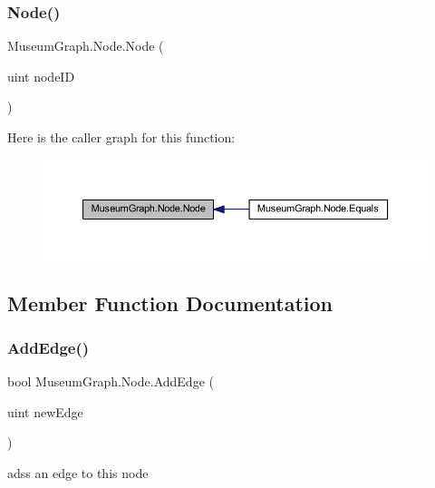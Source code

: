 \subsubsection{\texorpdfstring{Node()}{Node()}}
{\footnotesize\ttfamily Museum\+Graph.\+Node.\+Node (\begin{DoxyParamCaption}\item[{uint}]{node\+ID }\end{DoxyParamCaption})}

Here is the caller graph for this function\+:\nopagebreak
\begin{figure}[H]
\begin{center}
\leavevmode
\includegraphics[width=350pt]{class_museum_graph_1_1_node_a917a203c77b5aa5e65c7293ba896d2c1_icgraph}
\end{center}
\end{figure}


\subsection{Member Function Documentation}
\mbox{\label{class_museum_graph_1_1_node_adecbc3b471d15c5480d4c13e9502ac27}} 
\subsubsection{\texorpdfstring{Add\+Edge()}{AddEdge()}}
{\footnotesize\ttfamily bool Museum\+Graph.\+Node.\+Add\+Edge (\begin{DoxyParamCaption}\item[{uint}]{new\+Edge }\end{DoxyParamCaption})}



adss an edge to this node 


